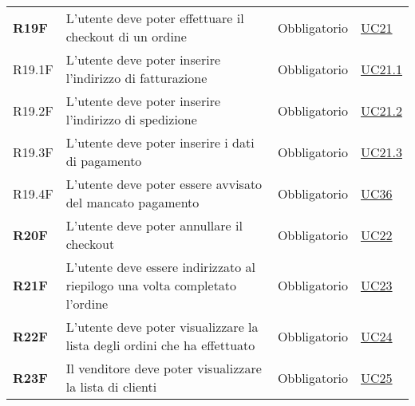 \begin{center}
\begin{longtable}[!h]{p{50px} p{245px} p{75px} p{50px}}
        \textbf{R19F}                         & L'utente deve poter effettuare il checkout di un ordine                                                                                             & Obbligatorio             & \hyperref[sec:UC21]{UC21}                      \\
        R19.1F                                & L'utente deve poter inserire l'indirizzo di fatturazione                                                                                            & Obbligatorio             & \hyperref[sec:UC21.1]{UC21.1}                  \\
        R19.2F                                & L'utente deve poter inserire l'indirizzo di spedizione                                                                                              & Obbligatorio             & \hyperref[sec:UC21.2]{UC21.2}                  \\
        R19.3F                                & L'utente deve poter inserire i dati di pagamento                                                                                                    & Obbligatorio             & \hyperref[sec:UC21.3]{UC21.3}                  \\
        R19.4F                                & L'utente deve poter essere avvisato del mancato pagamento                                                                                           & Obbligatorio             & \hyperref[sec:UC36]{UC36}                      \\
        \textbf{R20F}                         & L'utente deve poter annullare il checkout                                                                                                           & Obbligatorio             & \hyperref[sec:UC22]{UC22}                      \\
        \textbf{R21F}                         & L'utente deve essere indirizzato al riepilogo una volta completato l'ordine                                                                         & Obbligatorio             & \hyperref[sec:UC23]{UC23}                      \\
        \textbf{R22F}                         & L'utente deve poter visualizzare la lista degli ordini che ha effettuato                                                                            & Obbligatorio             & \hyperref[sec:UC24]{UC24}                      \\
        \textbf{R23F}                         & Il venditore deve poter visualizzare la lista di clienti                                                                                            & Obbligatorio             & \hyperref[sec:UC25]{UC25}                      \\

\end{longtable}
\end{center}
